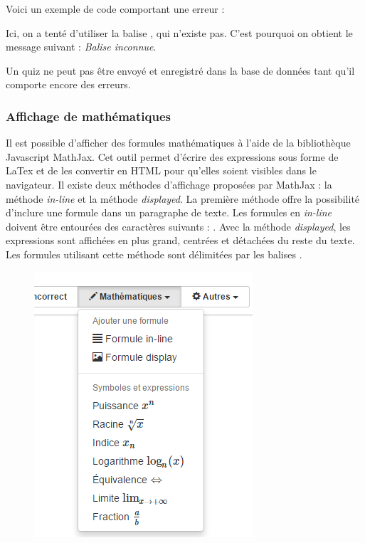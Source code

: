 \documentclass[a4,10pt,french]{sphinxmanual}
\begin{document}
Voici un exemple de code comportant une erreur :

Ici, on a tenté d'utiliser la balise \code{*=}, qui n'existe pas. C'est pourquoi on obtient le message suivant : \emph{Balise inconnue}.

Un quiz ne peut pas être envoyé et enregistré dans la base de données tant qu'il comporte encore des erreurs.


\subsubsection{Affichage de mathématiques}
\label{doc-user:affichage-de-mathematiques}
Il est possible d'afficher des formules mathématiques à l'aide de la bibliothèque Javascript MathJax. Cet outil permet d'écrire des expressions sous forme de LaTex et de les convertir en HTML pour qu'elles soient visibles dans le navigateur. Il existe deux méthodes d'affichage proposées par MathJax : la méthode \emph{in-line} et la méthode \emph{displayed}. La première méthode offre la possibilité d'inclure une formule dans un paragraphe de texte. Les formules en \emph{in-line} doivent être entourées des caractères suivants : . Avec la méthode \emph{displayed}, les expressions sont affichées en plus grand, centrées et détachées du reste du texte. Les formules utilisant cette méthode sont délimitées par les balises .
\begin{figure}[htbp]
\centering

\includegraphics{math-menu.png}
\end{figure}
\end{document}
